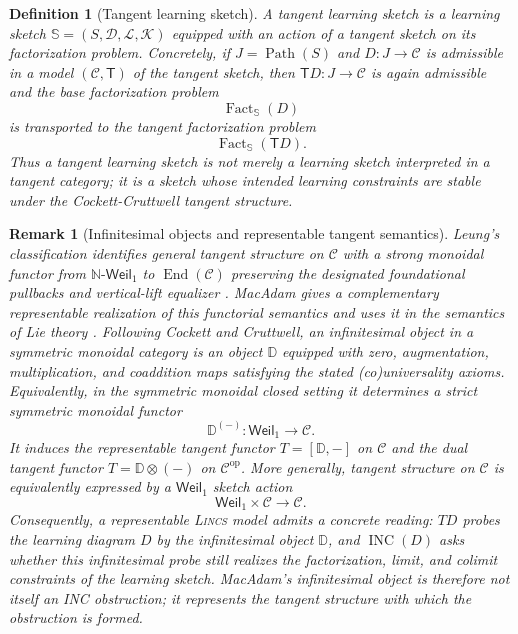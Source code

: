 \documentclass{article}
\newtheorem{definition}{Definition}
\newtheorem{remark}{Remark}
\newcommand{\C}{\mathcal{C}}
\newcommand{\T}{\mathsf{T}}
\newcommand{\Fact}{\operatorname{Fact}}
\newcommand{\Path}{\operatorname{Path}}
\begin{document}
\begin{definition}[Tangent learning sketch]
A tangent learning sketch is a learning sketch \(\mathbb S=(S,\mathcal D,\mathcal L,\mathcal K)\) equipped with an action of a tangent sketch on its factorization problem. Concretely, if \(J=\Path(S)\) and \(D:J\to\C\) is admissible in a model \((\C,\T)\) of the tangent sketch, then \(\T D:J\to\C\) is again admissible and the base factorization problem
\[
\Fact_{\mathbb S}(D)
\]
is transported to the tangent factorization problem
\[
\Fact_{\mathbb S}(\T D).
\]
Thus a tangent learning sketch is not merely a learning sketch interpreted in a tangent category; it is a sketch whose intended learning constraints are stable under the Cockett-Cruttwell tangent structure.
\end{definition}

\begin{remark}[Infinitesimal objects and representable tangent semantics]
Leung's classification identifies general tangent structure on $\C$ with a
strong monoidal functor from $\mathbb N\text{-}\mathsf{Weil}_1$ to
$\operatorname{End}(\C)$ preserving the designated foundational pullbacks and
vertical-lift equalizer \citep[Thm.~14.1]{leung2017classifying}.  MacAdam gives
a complementary representable realization of this functorial semantics and
uses it in the semantics of Lie theory \citep{macadam2022functorial}.
Following Cockett and Cruttwell, an
infinitesimal object in a symmetric monoidal category is an object $\mathbb D$
equipped with zero, augmentation, multiplication, and coaddition maps satisfying
the stated (co)universality axioms.  Equivalently, in the symmetric monoidal
closed setting it determines a strict symmetric monoidal functor
\[
\mathbb D^{(-)}:\mathsf{Weil}_1\longrightarrow\C.
\]
It induces the representable tangent functor $T=[\mathbb D,-]$ on $\C$ and the
dual tangent functor $T=\mathbb D\otimes(-)$ on $\C^{\mathrm{op}}$.  More
generally, tangent structure on $\C$ is equivalently expressed by a
$\mathsf{Weil}_1$ sketch action
\[
\mathsf{Weil}_1\times\C\longrightarrow\C.
\]
Consequently, a representable \textsc{Lincs} model admits a concrete reading:
$TD$ probes the learning diagram $D$ by the infinitesimal object $\mathbb D$,
and $\operatorname{INC}(D)$ asks whether this infinitesimal probe still
realizes the factorization, limit, and colimit constraints of the learning
sketch.  MacAdam's infinitesimal object is therefore not itself an INC
obstruction; it represents the tangent structure with which the obstruction is
formed.
\end{remark}
\end{document}
